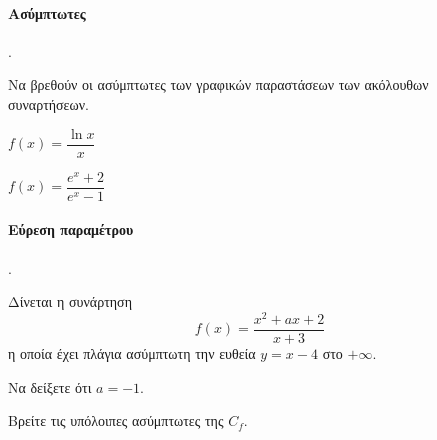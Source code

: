 \documentclass[11pt,a4paper,twocolumn]{article}
\newcounter{askhsh}
\newcommand{\askhsh}{\large\theaskhsh.\ \addtocounter{askhsh}{1}}
\begin{document}
\paragraph{Ασύμπτωτες}
\askhsh Να βρεθούν οι ασύμπτωτες των γραφικών παραστάσεων των ακόλουθων συναρτήσεων.
\begin{multicols}{2}
\begin{alist}
\item $f(x)=\dfrac{\ln{x}}{x}$
\item $f(x)=\dfrac{e^x+2}{e^x-1}$
\item 
\end{alist}
\end{multicols}
\paragraph{Εύρεση παραμέτρου}
\askhsh Δίνεται η συνάρτηση \[f(x)=\dfrac{x^2+ax+2}{x+3}\] η οποία έχει πλάγια ασύμπτωτη την ευθεία $y=x-4$ στο $+\infty$.
\begin{alist}
\item Να δείξετε ότι $a=-1$.
\item Βρείτε τις υπόλοιπες ασύμπτωτες της $C_f$.
\end{alist}
\end{document}
